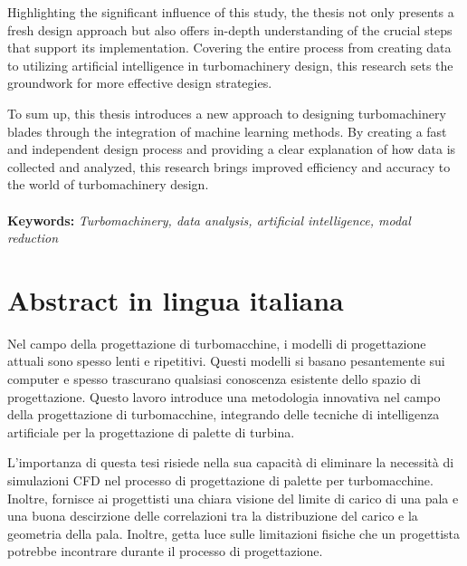\documentclass{config/polimiThesis}
\begin{document}
Highlighting the significant influence of this study, the thesis not only presents a fresh design approach but also offers in-depth understanding of the crucial steps that support its implementation. Covering the entire process from creating data to utilizing artificial intelligence in turbomachinery design, this research sets the groundwork for more effective design strategies.

To sum up, this thesis introduces a new approach to designing turbomachinery blades through the integration of machine learning methods. By creating a fast and independent design process and providing a clear explanation of how data is collected and analyzed, this research brings improved efficiency and accuracy to the world of turbomachinery design.
\\
\\
\textbf{Keywords:} \textit{Turbomachinery, data analysis, artificial intelligence, modal reduction}

\chapter*{Abstract in lingua italiana}
Nel campo della progettazione di turbomacchine, i modelli di progettazione attuali sono spesso lenti e ripetitivi. Questi modelli si basano pesantemente sui computer e spesso trascurano qualsiasi conoscenza esistente dello spazio di progettazione. Questo lavoro introduce una metodologia innovativa nel campo della progettazione di turbomacchine, integrando delle tecniche di intelligenza artificiale per la progettazione di palette di turbina.

L'importanza di questa tesi risiede nella sua capacità di eliminare la necessità di simulazioni CFD nel processo di progettazione di palette per turbomacchine. Inoltre, fornisce ai progettisti una chiara visione del limite di carico di una pala e una buona descirzione delle correlazioni tra la distribuzione del carico e la geometria della pala. Inoltre, getta luce sulle limitazioni fisiche che un progettista potrebbe incontrare durante il processo di progettazione.

\end{document}
